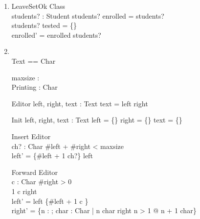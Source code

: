 \documentclass[12pt,letterpaper]{article}
\begin{document}
\begin{enumerate}
    \item
      \begin{schema}{LeaveSetOk}
        \Delta Class \\
        students? : \power Student
      \where
        students? \cap enrolled = students? \\
        students? \cap tested = \{\} \\
        enrolled' = enrolled \setminus students?
      \end{schema}

    \item
      \begin{zed}
        [ Char ] \\
        Text == \seq Char \\
      \end{zed}

      \begin{axdef}
        maxsize : \nat \\
        Printing : \power Char
      \end{axdef}

      \begin{schema}{Editor}
        left, right, text : Text
      \where
        text = left \cat right
      \end{schema}

      \begin{schema}{Init}
        left, right, text : Text
      \where
        left = \{\}
        right = \{\}
        text = \{\}
      \end{schema}

      \begin{schema}{Insert}
        \Delta Editor \\
        ch? : Char
      \where
        \#left + \#right < maxsize \\
        left' = \{\#left + 1 \mapsto ch?\} \cup left
      \end{schema}

      \begin{schema}{Forward}
        \Delta Editor \\
        c : Char
      \where
        \#right > 0 \\
        1 \mapsto c \in right \\
        left' = left \cup \{\#left + 1 \mapsto c \} \\
        right' = \{n : \nat; char : Char | n \mapsto char \in right \land n > 1 @ n + 1 \mapsto char\}
      \end{schema}


\end{enumerate}
\end{document}
